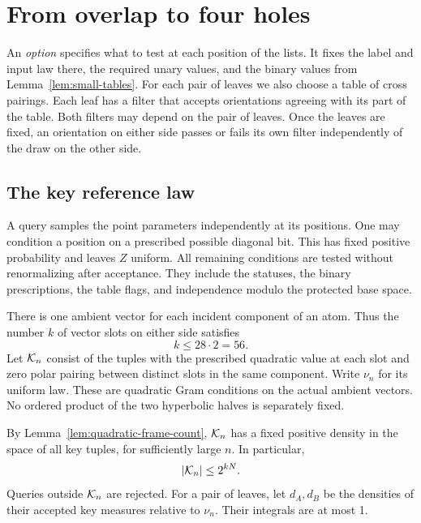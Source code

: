 \section{From overlap to four holes}\label{sec:collision}

An \emph{option} specifies what to test at each position of the lists.
It fixes the label and input law there, the required unary values, and
the binary values from Lemma~\ref{lem:small-tables}. For each pair of
leaves we also choose a table of cross pairings. Each leaf has a filter
that accepts orientations agreeing with its part of the table. Both
filters may depend on the pair of leaves. Once the leaves are fixed, an
orientation on either side passes or fails its own filter independently
of the draw on the other side.

\subsection{The key reference law}

A query samples the point parameters independently at its positions.
One may condition a position on a prescribed possible diagonal bit. This
has fixed positive probability and leaves \(Z\) uniform. All remaining
conditions are tested without renormalizing after acceptance.
They include the statuses, the binary prescriptions, the table flags, and
independence modulo the protected base space.

There is one ambient vector for each incident component of an atom.
Thus the number \(k\) of vector slots on either side satisfies
\begin{equation}\label{eq:key-rank-budget}
 k\le28\cdot2=56.
\end{equation}
Let \(\mathcal K_n\) consist of the tuples with the prescribed quadratic value
at each slot and zero polar pairing between distinct slots in the same
component. Write \(\nu_n\) for its uniform law. These are quadratic Gram
conditions on the actual ambient vectors. No ordered product of the two
hyperbolic halves is separately fixed.

By Lemma~\ref{lem:quadratic-frame-count}, \(\mathcal K_n\) has a fixed positive density
in the space of all key tuples, for sufficiently large \(n\). In particular,
\begin{equation}\label{eq:key-space-size}
 |\mathcal K_n|\le2^{kN}.
\end{equation}
Queries outside \(\mathcal K_n\) are rejected. For a pair of leaves, let
\(d_A,d_B\) be the densities of their accepted key measures relative to
\(\nu_n\). Their integrals are at most 1.


